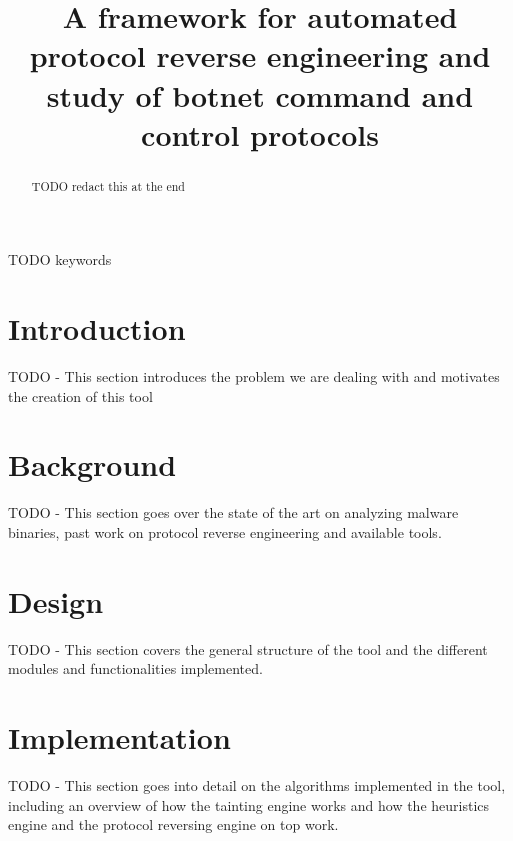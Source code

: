 \documentclass[conference]{IEEEtran}
\begin{document}
\title{A framework for automated protocol reverse engineering and study of botnet command and control protocols
}

\author{
\and
{}
}

\maketitle

\begin{abstract}
TODO redact this at the end
\end{abstract}

\begin{IEEEkeywords}
TODO keywords
\end{IEEEkeywords}

\section{Introduction}
TODO - This section introduces the problem we are dealing with and motivates the creation of this tool

\section{Background}

TODO - This section goes over the state of the art on analyzing malware binaries, past work on protocol reverse 
engineering and available tools. 

\section{Design}
TODO - This section covers the general structure of the tool and the different modules and functionalities implemented.

\section{Implementation}
TODO - This section goes into detail on the algorithms implemented in the tool, including an overview of how the tainting
engine works and how the heuristics engine and the protocol reversing engine on top work.
\end{document}
